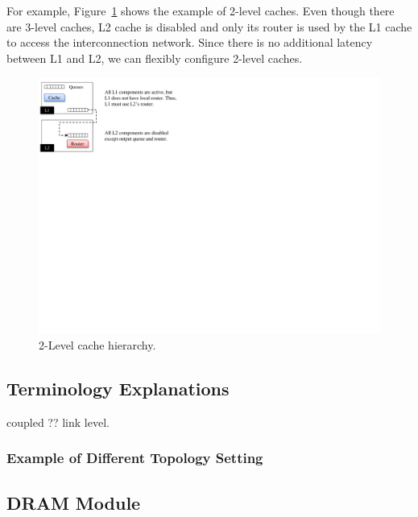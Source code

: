 For example, Figure~\ref{fig:level2cache} shows the example of 2-level
caches. Even though there are 3-level caches, L2 cache is disabled and
only its router is used by the L1 cache to access the interconnection
network. Since there is no additional latency between L1 and L2, we
can flexibly configure 2-level caches.


\begin{figure}[htb]
\centering
\includegraphics{figs/level2cache}
\caption{2-Level cache hierarchy.}
\label{fig:level2cache}
\end{figure}


\subsection{Terminology Explanations} 
coupled ?? 
link level. 

\subsubsection{Example of Different Topology Setting}

\subsection{DRAM Module} 
